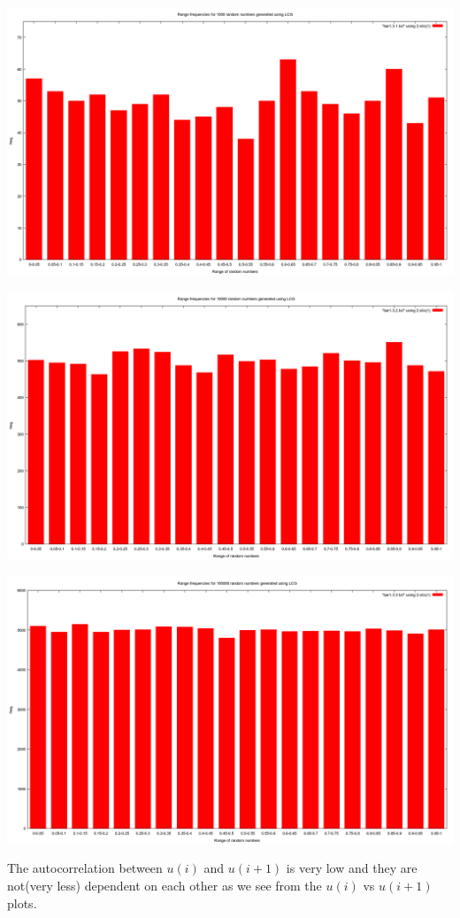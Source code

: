 \documentclass{article}
\begin{document}
\includegraphics[scale=0.3]{"bar1_3_1"}

\includegraphics[scale=0.3]{"bar1_3_2"}

\includegraphics[scale=0.3]{"bar1_3_3"}
\pagebreak

The autocorrelation between $u(i)$ and $u(i+1)$ is very low and they are 
not(very less) dependent on each other as we see from the $u(i)$ vs $u(i+1)$ plots.\\
\end{document}
